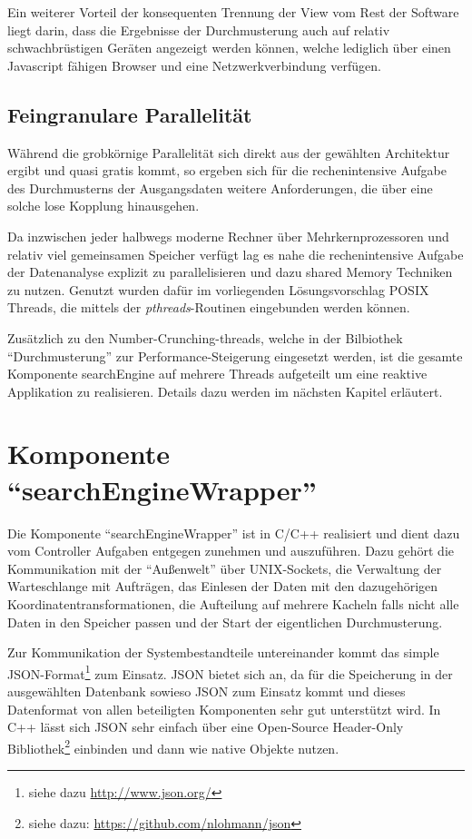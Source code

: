 \documentclass[10pt,a4paper]{report}
\begin{document}
Ein weiterer Vorteil der konsequenten Trennung der View vom Rest der Software liegt darin, dass die Ergebnisse der Durchmusterung auch auf relativ schwachbrüstigen Geräten angezeigt werden können, welche lediglich über einen Javascript fähigen Browser und eine Netzwerkverbindung verfügen.

\section{Feingranulare Parallelität}

Während die grobkörnige Parallelität sich direkt aus der gewählten Architektur ergibt und quasi gratis kommt, so ergeben sich für die rechenintensive Aufgabe des Durchmusterns der Ausgangsdaten weitere Anforderungen, die über eine solche lose Kopplung hinausgehen.

Da inzwischen jeder halbwegs moderne Rechner über Mehrkernprozessoren und relativ viel gemeinsamen Speicher verfügt lag es nahe die rechenintensive Aufgabe der Datenanalyse explizit zu parallelisieren und dazu shared Memory Techniken zu nutzen. Genutzt wurden dafür im vorliegenden Lösungsvorschlag POSIX Threads, die mittels der \emph{pthreads}-Routinen eingebunden werden können.

Zusätzlich zu den Number-Crunching-threads, welche in der Bilbiothek "`Durchmusterung"' zur Performance-Steigerung eingesetzt werden, ist die gesamte Komponente searchEngine auf mehrere Threads aufgeteilt um eine reaktive Applikation zu realisieren. Details dazu werden im nächsten Kapitel erläutert.


\chapter{Komponente "`searchEngineWrapper"'}

Die Komponente "`searchEngineWrapper"' ist in C/C++ realisiert und dient dazu vom Controller Aufgaben entgegen zunehmen und auszuführen. Dazu gehört die Kommunikation mit der "`Außenwelt"' über UNIX-Sockets, die Verwaltung der Warteschlange mit Aufträgen, das Einlesen der Daten mit den dazugehörigen Koordinatentransformationen, die Aufteilung auf mehrere Kacheln falls nicht alle Daten in den Speicher passen und der Start der eigentlichen Durchmusterung.

Zur Kommunikation der Systembestandteile untereinander kommt das simple JSON-Format\footnote{siehe dazu \url{http://www.json.org/}} zum Einsatz. JSON bietet sich an, da für die Speicherung in der ausgewählten Datenbank sowieso JSON zum Einsatz kommt und dieses Datenformat von allen beteiligten Komponenten sehr gut unterstützt wird. In C++ lässt sich JSON sehr einfach über eine Open-Source Header-Only Bibliothek\footnote{siehe dazu: \url{https://github.com/nlohmann/json}} einbinden und dann wie native Objekte nutzen.
\end{document}
